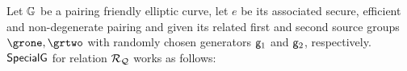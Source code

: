 \noindent Let ${\mathbb{G}}$ be a pairing friendly elliptic curve, let $e$ be its associated secure, efficient and 
non-degenerate pairing and given its related first  and second source groups $ \grone,\grtwo $ with randomly chosen generators 
$\mathsf{g}_1$ and $\mathsf{g}_2$, respectively.
$ {\mathsf{SpecialG}} $ for relation $\mathcal{R}_{\mathcal{Q}}$ works as follows: %
